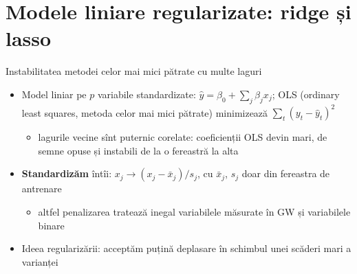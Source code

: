 \section{Modele liniare regularizate: ridge și lasso}

\begin{frame}{Instabilitatea metodei celor mai mici pătrate cu multe laguri}
\itemsize{\small}
\begin{itemize}
    \item Model liniar pe $p$ variabile standardizate: $\hat y = \beta_0 + \sum_j \beta_j x_j$; OLS (ordinary least squares, metoda celor mai mici pătrate) minimizează $\sum_t (y_t - \hat y_t)^2$
    \begin{itemize}
        \item lagurile vecine sînt puternic corelate: coeficienții OLS devin mari, de semne opuse și instabili de la o fereastră la alta
    \end{itemize}
    \item \textbf{Standardizăm} întîi: $x_j \to (x_j - \bar x_j)/s_j$, cu $\bar x_j$, $s_j$ doar din fereastra de antrenare
    \begin{itemize}
        \item altfel penalizarea tratează inegal variabilele măsurate în GW și variabilele binare
    \end{itemize}
    \item Ideea regularizării: acceptăm puțină deplasare în schimbul unei scăderi mari a varianței
\end{itemize}
\end{frame}

